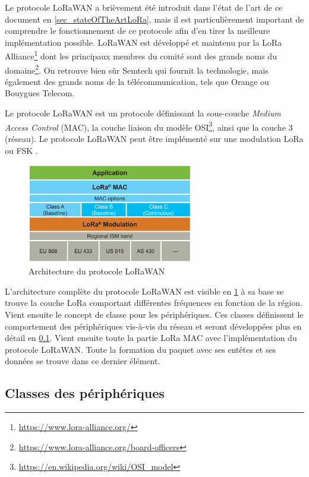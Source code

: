 
Le protocole LoRaWAN a brièvement été introduit dans l'état de l'art de ce document en \cref{sec_stateOfTheArtLoRa}, mais il est particulièrement important de comprendre le fonctionnement de ce protocole afin d'en tirer la meilleure implémentation possible. LoRaWAN est développé et maintenu par la LoRa Alliance\footnote{\url{https://www.lora-alliance.org/}} dont les principaux membres du comité sont des grands noms du domaine\footnote{\url{https://www.lora-alliance.org/board-officers}}. On retrouve bien sûr Semtech qui fournit la technologie, mais également des grands noms de la télécommunication, tels que Orange ou Bouygues Telecom. 

Le protocole LoRaWAN est un protocole définissant la sous-couche \textit{Medium Access Control} (MAC), la couche liaison du modèle OSI\footnote{\url{https://en.wikipedia.org/wiki/OSI_model}}, ainsi que la couche 3 (réseau). Le protocole LoRaWAN peut être implémenté sur une modulation LoRa ou FSK \cite{HomeTheT94:online}.

\begin{figure}[ht!]
    \centering
    \includegraphics[width=0.65\textwidth]{Figures/Protocols/LoRaWAN/lorawan_and_lora_stack.PNG}
    \caption{Architecture du protocole LoRaWAN}
    \label{fig-lorawan_and_lora_stack}
\end{figure}

L'architecture complète du protocole LoRaWAN est visible en \cref{fig-lorawan_and_lora_stack} à sa base se trouve la couche LoRa comportant différentes fréquences en fonction de la région. Vient ensuite le concept de classe pour les périphériques. Ces classes définissent le comportement des périphériques vis-à-vis du réseau et seront développées plus en détail en \cref{sec-protocols_lorawan_classes}. Vient ensuite toute la partie LoRa MAC avec l'implémentation du protocole LoRaWAN. Toute la formation du paquet avec ses entêtes et ses données se trouve dans ce dernier élément.



\subsection{Classes des périphériques}
\label{sec-protocols_lorawan_classes}

